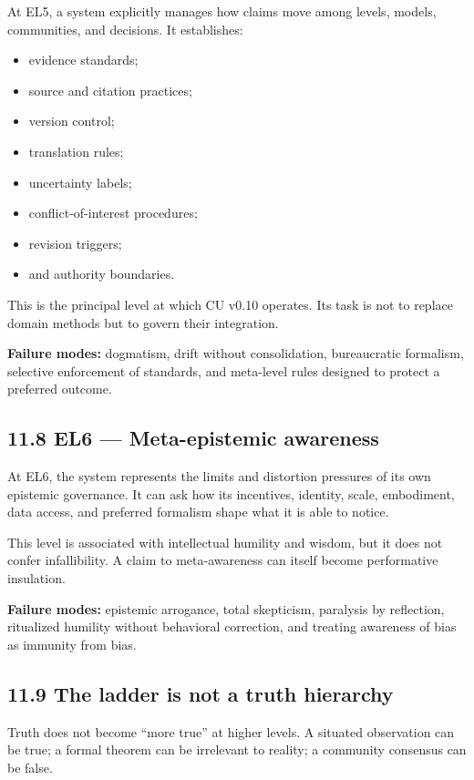 \documentclass[
  11pt,
]{article}
\providecommand{\tightlist}{%
  \setlength{\itemsep}{0pt}\setlength{\parskip}{0pt}}
\begin{document}
At EL5, a system explicitly manages how claims move among levels,
models, communities, and decisions. It establishes:

\begin{itemize}
\tightlist
\item
  evidence standards;
\item
  source and citation practices;
\item
  version control;
\item
  translation rules;
\item
  uncertainty labels;
\item
  conflict-of-interest procedures;
\item
  revision triggers;
\item
  and authority boundaries.
\end{itemize}

This is the principal level at which CU v0.10 operates. Its task is not
to replace domain methods but to govern their integration.

\textbf{Failure modes:} dogmatism, drift without consolidation,
bureaucratic formalism, selective enforcement of standards, and
meta-level rules designed to protect a preferred outcome.

\subsection{11.8 EL6 --- Meta-epistemic
awareness}\label{el6-meta-epistemic-awareness}

At EL6, the system represents the limits and distortion pressures of its
own epistemic governance. It can ask how its incentives, identity,
scale, embodiment, data access, and preferred formalism shape what it is
able to notice.

This level is associated with intellectual humility and wisdom, but it
does not confer infallibility. A claim to meta-awareness can itself
become performative insulation.

\textbf{Failure modes:} epistemic arrogance, total skepticism, paralysis
by reflection, ritualized humility without behavioral correction, and
treating awareness of bias as immunity from bias.

\subsection{11.9 The ladder is not a truth
hierarchy}\label{the-ladder-is-not-a-truth-hierarchy}

Truth does not become ``more true'' at higher levels. A situated
observation can be true; a formal theorem can be irrelevant to reality;
a community consensus can be false.
\end{document}
